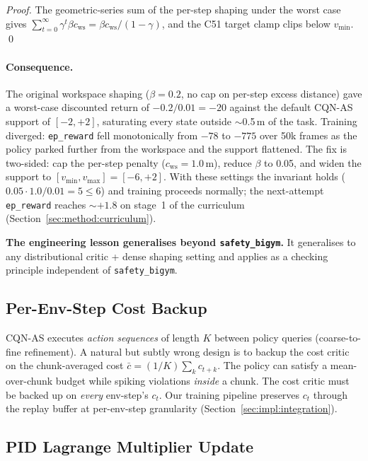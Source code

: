 \documentclass[11pt,a4paper]{report}
\newcommand{\sbigym}{\texttt{safety\_bigym}}
\newcommand{\cqnas}{CQN-AS}
\begin{document}
\begin{proof}
The geometric-series sum of the per-step shaping under the worst
case gives $\sum_{t=0}^\infty \gamma^t \beta c_{\mathrm{ws}} =
\beta c_{\mathrm{ws}} / (1-\gamma)$, and the C51 target clamp
clips below $v_{\min}$. \qed
\end{proof}

\paragraph{Consequence.}
The original workspace shaping ($\beta = 0.2$, no cap on per-step
excess distance) gave a worst-case discounted return of
$-0.2 / 0.01 = -20$ against the default \cqnas{} support of
$[-2, +2]$, saturating every state outside $\sim$0.5\,m of the
task. Training diverged: \texttt{ep\_reward} fell monotonically
from $-78$ to $-775$ over 50k frames as the policy parked further
from the workspace and the support flattened. The fix is
two-sided: cap the per-step penalty ($c_{\mathrm{ws}} = 1.0$\,m),
reduce $\beta$ to 0.05, and widen the support to
$[v_{\min}, v_{\max}] = [-6, +2]$. With these settings the
invariant holds ($0.05 \cdot 1.0 / 0.01 = 5 \le 6$) and training
proceeds normally; the next-attempt \texttt{ep\_reward} reaches
$\sim +1.8$ on stage~1 of the curriculum
(Section~\ref{sec:method:curriculum}).

\textbf{The engineering lesson generalises beyond \sbigym{}.} It
generalises to any distributional critic + dense shaping setting
and applies as a checking principle independent of \sbigym{}.

\subsection{Per-Env-Step Cost Backup}
\label{sec:method:lagrangian:per-step}

\cqnas{} executes \emph{action sequences} of length $K$ between
policy queries (coarse-to-fine refinement). A natural but subtly
wrong design is to backup the cost critic on the chunk-averaged
cost $\bar{c} = (1/K) \sum_{k} c_{t+k}$. The policy can satisfy a
mean-over-chunk budget while spiking violations \emph{inside} a
chunk. The cost critic must be backed up on \emph{every} env-step's
$c_t$. Our training pipeline preserves $c_t$ through the replay
buffer at per-env-step granularity
(Section~\ref{sec:impl:integration}).

\subsection{PID Lagrange Multiplier Update}
\label{sec:method:lagrangian:pid}
\end{document}
